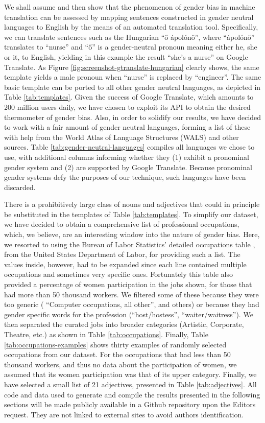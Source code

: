 \documentclass[fleqn,10pt]{article}
\begin{document}
We shall assume and then show that the phenomenon of gender bias in machine translation can be assessed by mapping sentences constructed in gender neutral languages to English by the means of an automated translation tool. Specifically, we can translate sentences such as the Hungarian ``ő ápolónő'', where ``ápolónő'' translates to ``nurse'' and ``ő'' is a gender-neutral pronoun meaning either he, she or it, to English, yielding in this example the result ``she's a nurse'' on Google Translate. As Figure \ref{fig:screenshot-gtranslate-hungarian} clearly shows, the same template yields a male pronoun when ``nurse'' is replaced by ``engineer''. The same basic template can be ported to all other gender neutral languages, as depicted in Table \ref{tab:templates}. Given the success of Google Translate, which amounts to 200 million users daily, we have chosen to exploit its API to obtain the desired thermometer of gender bias. Also, in order to solidify our results, we have decided to work with a fair amount of gender neutral languages, forming a list of these with help from the World Atlas of Language Structures (WALS) \citep{wals} and other sources. Table \ref{tab:gender-neutral-languages} compiles all languages we chose to use, with additional columns informing whether they
(1) exhibit a pronominal gender system and (2) are supported by Google Translate. Because pronominal gender systems defy the purposes of our technique, such languages have been discarded.

There is a prohibitively large class of nouns and adjectives that could in principle be substituted in the templates of Table \ref{tab:templates}. To simplify our dataset, we have decided to obtain a comprehensive list of professional occupations, which, we believe, are an interesting window into the nature of gender bias. Here, we resorted to using the Bureau of Labor Statistics' detailed occupations table \citep{BLS2017}, from the United States Department of Labor, for providing such a list. The values inside, however, had to be expanded since each line contained multiple occupations and sometimes very specific ones. Fortunately this table also provided a percentage of women participation in the jobs shown, for those that had more than 50 thousand workers. We filtered some of these because they were too generic ( ``Computer occupations, all other'', and others) or because they had gender specific words for the profession (``host/hostess'', ``waiter/waitress''). We then separated the curated jobs into broader categories (Artistic, Corporate, Theatre, etc.) as shown in Table \ref{tab:occupations}. Finally, Table \ref{tab:occupations-examples} shows thirty examples of randomly selected occupations from our dataset. For the occupations that had less than 50 thousand workers, and thus no data about the participation of women, we assumed that its women participation was that of its upper category. Finally, we have selected a small list of 21 adjectives, presented in Table \ref{tab:adjectives}. All code and data used to generate and compile the results presented in the following sections will be made publicly available in a Github repository upon the Editors request. They are not linked to external sites to avoid authors identification. 
\end{document}
